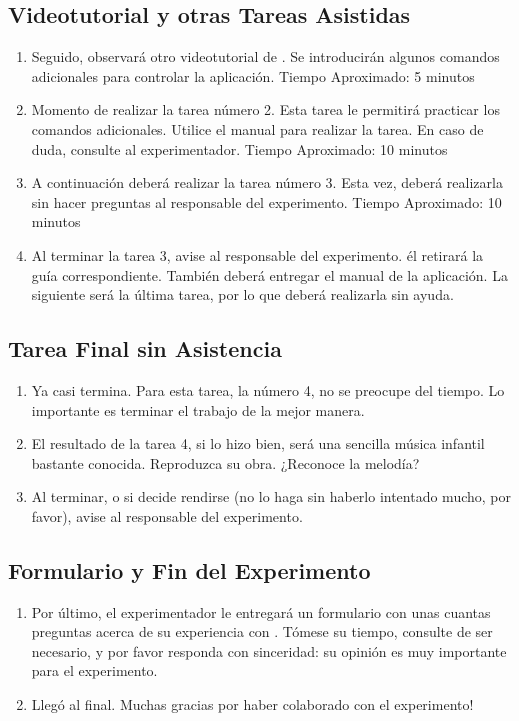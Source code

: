 \subsection{Videotutorial y otras Tareas Asistidas}

\begin{enumerate}
    \setcounter{enumi}{\theenumTemp}
    \item Seguido, observar\'a otro videotutorial de . Se introducir\'an algunos comandos adicionales para controlar la aplicaci\'on. Tiempo Aproximado: 5 minutos
    \item Momento de realizar la tarea n\'umero 2. Esta tarea le permitir\'a practicar los comandos adicionales. Utilice el manual para realizar la tarea. En caso de duda, consulte al experimentador.
    Tiempo Aproximado: 10 minutos
    \item A continuaci\'on deber\'a realizar la tarea n\'umero 3. Esta vez, deber\'a realizarla sin hacer preguntas al responsable del experimento.
    Tiempo Aproximado: 10 minutos
    \item Al terminar la tarea 3, avise al responsable del experimento. \'el retirar\'a la gu\'ia correspondiente. Tambi\'en deber\'a entregar el manual de la aplicaci\'on. La siguiente ser\'a la \'ultima tarea, por lo que deber\'a realizarla sin ayuda.
    \setcounter{enumTemp}{\theenumi}
\end{enumerate}

\subsection{Tarea Final sin Asistencia}

\begin{enumerate}
    \setcounter{enumi}{\theenumTemp}
    \item Ya casi termina. Para esta tarea, la n\'umero 4, no se preocupe del tiempo. Lo importante es terminar el trabajo de la mejor manera. 
    \item El resultado de la tarea 4, si lo hizo bien, ser\'a una sencilla m\'usica infantil bastante conocida. Reproduzca su obra. ¿Reconoce la melod\'ia?
    \item Al terminar, o si decide rendirse (no lo haga sin haberlo intentado mucho, por favor), avise al responsable del experimento.
    \setcounter{enumTemp}{\theenumi}
\end{enumerate}

\subsection{Formulario y Fin del Experimento}

\begin{enumerate}
    \setcounter{enumi}{\theenumTemp}
    \item Por \'ultimo, el experimentador le entregar\'a un formulario con unas cuantas preguntas acerca de su experiencia con . T\'omese su tiempo, consulte de ser necesario, y por favor responda con sinceridad: su opini\'on es muy importante para el experimento.
    \item Lleg\'o al final. Muchas gracias por haber colaborado con el experimento! 
\end{enumerate}

